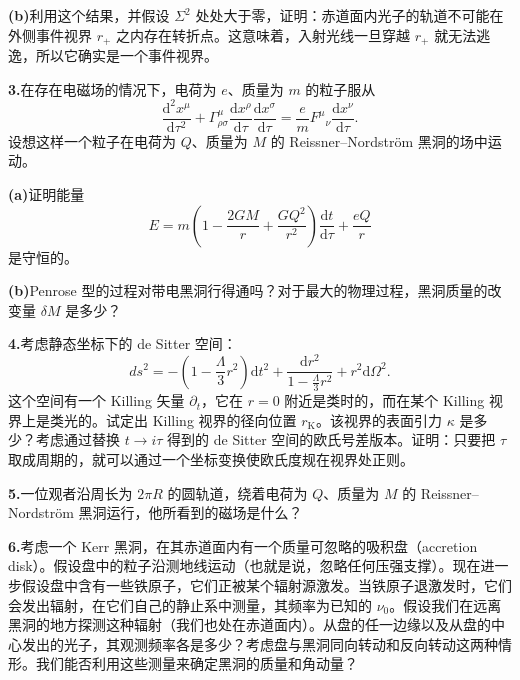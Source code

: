 \textbf{(b)}\quad 利用这个结果，并假设 $\Sigma^{2}$ 处处大于零，证明：赤道面内光子的轨道不可能在外侧事件视界 $r_{+}$ 之内存在转折点。这意味着，入射光线一旦穿越 $r_{+}$ 就无法逃逸，所以它确实是一个事件视界。


\textbf{3.}\quad 在存在电磁场的情况下，电荷为 $e$、质量为 $m$ 的粒子服从
\begin{equation*}
\frac{\mathrm{d}^{2}x^{\mu}}{\mathrm{d}\tau^{2}} + \Gamma^{\mu}_{\rho\sigma}\frac{\mathrm{d}x^{\rho}}{\mathrm{d}\tau}\frac{\mathrm{d}x^{\sigma}}{\mathrm{d}\tau} = \frac{e}{m}F^{\mu}{}_{\nu}\frac{\mathrm{d}x^{\nu}}{\mathrm{d}\tau}.
\tag{6.122}
\end{equation*}
设想这样一个粒子在电荷为 $Q$、质量为 $M$ 的 Reissner–Nordström 黑洞的场中运动。

\textbf{(a)}\quad 证明能量
\begin{equation*}
E = m\left(1 - \frac{2GM}{r} + \frac{GQ^{2}}{r^{2}}\right)\frac{\mathrm{d}t}{\mathrm{d}\tau} + \frac{eQ}{r}
\tag{6.123}
\end{equation*}
是守恒的。

\textbf{(b)}\quad Penrose 型的过程对带电黑洞行得通吗？对于最大的物理过程，黑洞质量的改变量 $\delta M$ 是多少？

\textbf{4.}\quad 考虑静态坐标下的 de Sitter 空间：
\begin{equation*}
ds^{2} = -\left(1 - \frac{\Lambda}{3}r^{2}\right)\mathrm{d}t^{2} + \frac{\mathrm{d}r^{2}}{1 - \frac{\Lambda}{3}r^{2}} + r^{2}\mathrm{d}\Omega^{2}.
\end{equation*}
这个空间有一个 Killing 矢量 $\partial_t$，它在 $r=0$ 附近是类时的，而在某个 Killing 视界上是类光的。试定出 Killing 视界的径向位置 $r_{\mathrm{K}}$。该视界的表面引力 $\kappa$ 是多少？考虑通过替换 $t\rightarrow i\tau$ 得到的 de Sitter 空间的欧氏号差版本。证明：只要把 $\tau$ 取成周期的，就可以通过一个坐标变换使欧氏度规在视界处正则。

\textbf{5.}\quad 一位观者沿周长为 $2\pi R$ 的圆轨道，绕着电荷为 $Q$、质量为 $M$ 的 Reissner–Nordström 黑洞运行，他所看到的磁场是什么？

\textbf{6.}\quad 考虑一个 Kerr 黑洞，在其赤道面内有一个质量可忽略的吸积盘（accretion disk）。假设盘中的粒子沿测地线运动（也就是说，忽略任何压强支撑）。现在进一步假设盘中含有一些铁原子，它们正被某个辐射源激发。当铁原子退激发时，它们会发出辐射，在它们自己的静止系中测量，其频率为已知的 $\nu_{0}$。假设我们在远离黑洞的地方探测这种辐射（我们也处在赤道面内）。从盘的任一边缘以及从盘的中心发出的光子，其观测频率各是多少？考虑盘与黑洞同向转动和反向转动这两种情形。我们能否利用这些测量来确定黑洞的质量和角动量？
